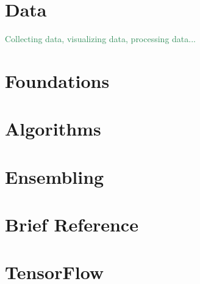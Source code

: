 \documentclass[12pt]{book}
\def\r#1{\textcolor{SeaGreen}{#1}}
\begin{document}



\part{Data}
\r{Collecting data, visualizing data, processing data...}



\part{Foundations}



\part{Algorithms}


\part{Ensembling}






\part{Brief Reference}




\part{TensorFlow}


\end{document}
